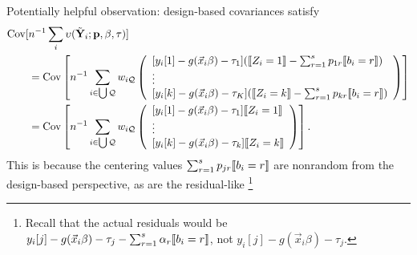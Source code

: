 \documentclass{article}
\DeclarePairedDelimiter{\indicator}{\llbracket}{\rrbracket}
\begin{document}
Potentially helpful observation: design-based covariances satisfy
\begin{align*}
  \operatorname{Cov}[&n^{-1}\sum_{i}\upsilon(\tilde{\mathbf{Y}}_{i};
  \mathbf{p}, \beta, \tau)] \\
                     &=   \operatorname{Cov}\left[n^{-1}\sum_{i \in \bigcup \mathcal{Q}}
                       w_{i\mathcal{Q}}
\left(
                                             \begin{array}{l}                                               
           [y_{i}[1]
                                               -
                                               g(\vec{x}_{i}\beta)-\tau_{1}](
                                               \indicator{Z_{i}=1} - \sum_{r=1}^{s}p_{1r}\indicator{b_{i}=r})\\
                  \vdots \\
{}           [y_{i}[k]
                                               - g(\vec{x}_{i}\beta) -
                                               \tau_{K}](\indicator{Z_{i}=k}
                                               - \sum_{r=1}^{s}p_{kr}\indicator{b_{i}=r})\\                                             \end{array}
\right) \right]\\
                     &=  \operatorname{Cov}\left[n^{-1}\sum_{i \in \bigcup \mathcal{Q}}
w_{i\mathcal{Q}}
\left(
                                             \begin{array}{l}                                               
           [y_{i}[1]
                                               -
                                               g(\vec{x}_{i}\beta)-\tau_{1}]
                                               \indicator{Z_{i}=1}\\
                  \vdots \\
{}           [y_{i}[k]
                                               - g(\vec{x}_{i}\beta) -
                                               \tau_{k}]\indicator{Z_{i}=k}\\                                             \end{array}
\right)
\right].
\end{align*}
This is because the centering values
$\sum_{r=1}^{s}p_{jr}\indicator{b_{i}=r}$ are nonrandom from the
design-based perspective, as are the residual-like%
\footnote{Recall that the actual residuals would be $y_{i}[j] -
  g(\vec{x}_{i}\beta) - \tau_{j} - \sum_{r=1}^{s}\alpha_{r}\indicator{b_{i}=r}$, not $y_{i}[j] - g(\vec{x}_{i}\beta) - \tau_{j}$.}
\end{document}
